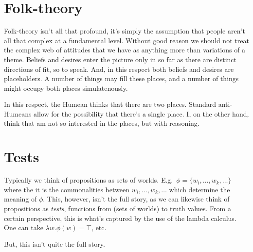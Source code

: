 \documentclass[10pt]{article}
\begin{document}
\section{Folk-theory}
\label{sec:folk-theory}

Folk-theory isn't all that profound, it's simply the assumption that people aren't all that complex at a fundamental level.
Without good reason we should not treat the complex web of attitudes that we have as anything more than variations of a theme.
Beliefs and desires enter the picture only in so far as there are distinct directions of fit, so to speak.
And, in this respect both beliefs and desires are placeholders.
A number of things may fill these places, and a number of things might occupy both places simulatenously.

In this respect, the Humean thinks that there are two places.
Standard anti-Humeans allow for the possibility that there's a single place.
I, on the other hand, think that am not so interested in the places, but with reasoning.


\section{Tests}
\label{sec:tests}

Typically we think of propositions as sets of worlds.
E.g.\ \(\phi = \{w_{i}, \dots, w_{k}, \dots\}\) where the it is the commonalities between \(w_{i}, \dots, w_{k}, \dots\) which determine the meaning of \(\phi\).
This, however, isn't the full story, as we can likewise think of propositions as \emph{tests}, functions from (sets of worlds) to truth values.
From a certain perspective, this is what's captured by the use of the lambda calculus.
One can take \(\lambda w.\phi(w) = \top\), etc.\

But, this isn't quite the full story.
\end{document}

